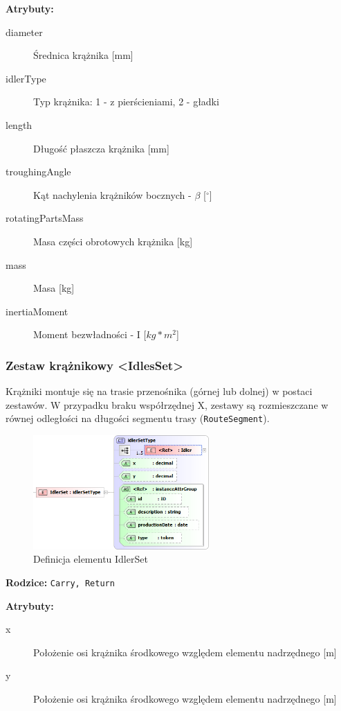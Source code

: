 \documentclass[12pt,a4paper]{article}
\begin{document}
\noindent\textbf{Atrybuty:}
\begin{description}
\item[diameter] Średnica krążnika [mm]
\item[idlerType] Typ krążnika: 1 - z pierścieniami, 2 - gładki
\item[length] Długość płaszcza krążnika [mm]
\item[troughingAngle] Kąt nachylenia krążników bocznych - $\beta$ [$^\circ$]
\item[rotatingPartsMass] Masa części obrotowych krążnika [kg]
\item[mass] Masa [kg]
\item[inertiaMoment] Moment bezwładności - I [$kg*m^2$]
\end{description}


\subsubsection{Zestaw krążnikowy <IdlesSet>}
Krążniki montuje się na trasie przenośnika (górnej lub dolnej) w postaci
zestawów.  W przypadku braku współrzędnej X, zestawy są rozmieszczane w równej
odległości na długości segmentu trasy ({\tt RouteSegment}).

\begin{figure}[H]
  \centering
  \includegraphics[width=0.6\textwidth]{png/liquid/IdlerSet}
  \caption{Definicja elementu IdlerSet}
  \label{fig:idlerSet-xsd}
\end{figure}

\noindent\textbf{Rodzice:} \texttt{Carry, Return}

\noindent\textbf{Atrybuty:}
\begin{description}
\item[x] Położenie osi krążnika środkowego względem elementu nadrzędnego [m]
\item[y] Położenie osi krążnika środkowego względem elementu nadrzędnego [m]
\end{description}
\end{document}
